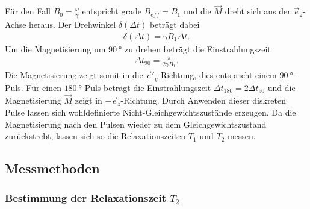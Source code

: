 \FloatBarrier
Für den Fall $B_0=\frac{\omega}{\gamma}$ entspricht grade $B_{eff}=B_1$
und die $\vec{M}$ dreht sich aus der $\vec{e}_z$-Achse heraus.
Der Drehwinkel $\delta(\Delta t)$ beträgt dabei
\begin{align}
  \delta(\Delta t)=\gamma B_1 \Delta t.
\end{align}
Um die Magnetisierung um $\SI{90}{\degree}$ zu drehen beträgt die
Einstrahlungszeit
\begin{align}
  \Delta t_{90} = \frac{\pi}{2\gamma B_1}.
\end{align}
Die Magnetisierung zeigt somit in die $\vec{e}'_y$-Richtung, dies
entspricht einem $\SI{90}{\degree}$-Puls.
Für einen $\SI{180}{\degree}$-Puls beträgt die Einstrahlungszeit
$\Delta t_{180}=2\Delta t_{90}$ und die Magnetisierung $\vec{M}$
zeigt in $-\vec{e}_z$-Richtung.
Durch Anwenden dieser diskreten Pulse lassen sich
wohldefinierte Nicht-Gleichgewichtszustände erzeugen.
Da die Magnetisierung nach den Pulsen wieder zu dem
Gleichgewichtszustand zurückstrebt, lassen sich so die
Relaxationszeiten $T_1$ und $T_2$ messen.

\subsection{Messmethoden}
\subsubsection{Bestimmung der Relaxationszeit $T_2$}
